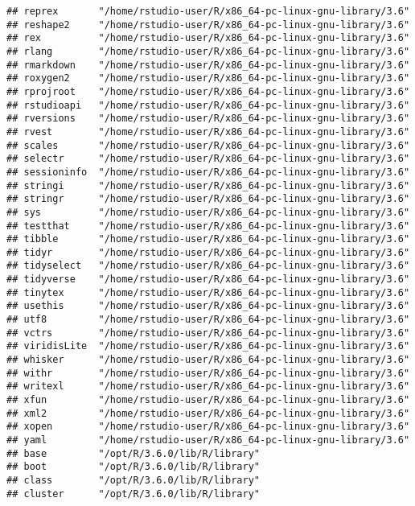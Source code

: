 \documentclass[]{book}
\begin{document}
\begin{verbatim}
## reprex       "/home/rstudio-user/R/x86_64-pc-linux-gnu-library/3.6"
## reshape2     "/home/rstudio-user/R/x86_64-pc-linux-gnu-library/3.6"
## rex          "/home/rstudio-user/R/x86_64-pc-linux-gnu-library/3.6"
## rlang        "/home/rstudio-user/R/x86_64-pc-linux-gnu-library/3.6"
## rmarkdown    "/home/rstudio-user/R/x86_64-pc-linux-gnu-library/3.6"
## roxygen2     "/home/rstudio-user/R/x86_64-pc-linux-gnu-library/3.6"
## rprojroot    "/home/rstudio-user/R/x86_64-pc-linux-gnu-library/3.6"
## rstudioapi   "/home/rstudio-user/R/x86_64-pc-linux-gnu-library/3.6"
## rversions    "/home/rstudio-user/R/x86_64-pc-linux-gnu-library/3.6"
## rvest        "/home/rstudio-user/R/x86_64-pc-linux-gnu-library/3.6"
## scales       "/home/rstudio-user/R/x86_64-pc-linux-gnu-library/3.6"
## selectr      "/home/rstudio-user/R/x86_64-pc-linux-gnu-library/3.6"
## sessioninfo  "/home/rstudio-user/R/x86_64-pc-linux-gnu-library/3.6"
## stringi      "/home/rstudio-user/R/x86_64-pc-linux-gnu-library/3.6"
## stringr      "/home/rstudio-user/R/x86_64-pc-linux-gnu-library/3.6"
## sys          "/home/rstudio-user/R/x86_64-pc-linux-gnu-library/3.6"
## testthat     "/home/rstudio-user/R/x86_64-pc-linux-gnu-library/3.6"
## tibble       "/home/rstudio-user/R/x86_64-pc-linux-gnu-library/3.6"
## tidyr        "/home/rstudio-user/R/x86_64-pc-linux-gnu-library/3.6"
## tidyselect   "/home/rstudio-user/R/x86_64-pc-linux-gnu-library/3.6"
## tidyverse    "/home/rstudio-user/R/x86_64-pc-linux-gnu-library/3.6"
## tinytex      "/home/rstudio-user/R/x86_64-pc-linux-gnu-library/3.6"
## usethis      "/home/rstudio-user/R/x86_64-pc-linux-gnu-library/3.6"
## utf8         "/home/rstudio-user/R/x86_64-pc-linux-gnu-library/3.6"
## vctrs        "/home/rstudio-user/R/x86_64-pc-linux-gnu-library/3.6"
## viridisLite  "/home/rstudio-user/R/x86_64-pc-linux-gnu-library/3.6"
## whisker      "/home/rstudio-user/R/x86_64-pc-linux-gnu-library/3.6"
## withr        "/home/rstudio-user/R/x86_64-pc-linux-gnu-library/3.6"
## writexl      "/home/rstudio-user/R/x86_64-pc-linux-gnu-library/3.6"
## xfun         "/home/rstudio-user/R/x86_64-pc-linux-gnu-library/3.6"
## xml2         "/home/rstudio-user/R/x86_64-pc-linux-gnu-library/3.6"
## xopen        "/home/rstudio-user/R/x86_64-pc-linux-gnu-library/3.6"
## yaml         "/home/rstudio-user/R/x86_64-pc-linux-gnu-library/3.6"
## base         "/opt/R/3.6.0/lib/R/library"                          
## boot         "/opt/R/3.6.0/lib/R/library"                          
## class        "/opt/R/3.6.0/lib/R/library"                          
## cluster      "/opt/R/3.6.0/lib/R/library"                          

\end{verbatim}
\end{document}

